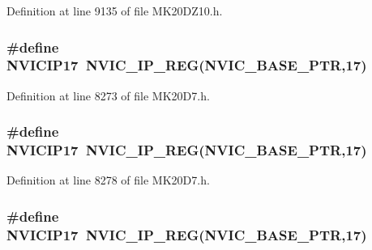 Definition at line 9135 of file M\+K20\+D\+Z10.\+h.

\subsubsection[{\texorpdfstring{N\+V\+I\+C\+I\+P17}{NVICIP17}}]{\setlength{\rightskip}{0pt plus 5cm}\#define N\+V\+I\+C\+I\+P17~{\bf N\+V\+I\+C\+\_\+\+I\+P\+\_\+\+R\+EG}({\bf N\+V\+I\+C\+\_\+\+B\+A\+S\+E\+\_\+\+P\+TR},17)}\hypertarget{group___n_v_i_c___register___accessor___macros_ga4bbb19d7684112351fadba13bd2bf396}{}\label{group___n_v_i_c___register___accessor___macros_ga4bbb19d7684112351fadba13bd2bf396}


Definition at line 8273 of file M\+K20\+D7.\+h.

\subsubsection[{\texorpdfstring{N\+V\+I\+C\+I\+P17}{NVICIP17}}]{\setlength{\rightskip}{0pt plus 5cm}\#define N\+V\+I\+C\+I\+P17~{\bf N\+V\+I\+C\+\_\+\+I\+P\+\_\+\+R\+EG}({\bf N\+V\+I\+C\+\_\+\+B\+A\+S\+E\+\_\+\+P\+TR},17)}\hypertarget{group___n_v_i_c___register___accessor___macros_ga4bbb19d7684112351fadba13bd2bf396}{}\label{group___n_v_i_c___register___accessor___macros_ga4bbb19d7684112351fadba13bd2bf396}


Definition at line 8278 of file M\+K20\+D7.\+h.

\subsubsection[{\texorpdfstring{N\+V\+I\+C\+I\+P17}{NVICIP17}}]{\setlength{\rightskip}{0pt plus 5cm}\#define N\+V\+I\+C\+I\+P17~{\bf N\+V\+I\+C\+\_\+\+I\+P\+\_\+\+R\+EG}({\bf N\+V\+I\+C\+\_\+\+B\+A\+S\+E\+\_\+\+P\+TR},17)}\hypertarget{group___n_v_i_c___register___accessor___macros_ga4bbb19d7684112351fadba13bd2bf396}{}\label{group___n_v_i_c___register___accessor___macros_ga4bbb19d7684112351fadba13bd2bf396}


